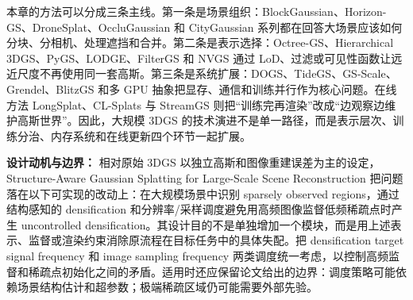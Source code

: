 \begin{takeaway}
本章的方法可以分成三条主线。第一条是场景组织：BlockGaussian、Horizon-GS、DroneSplat、OccluGaussian 和 CityGaussian 系列都在回答大场景应该如何分块、分相机、处理遮挡和合并。第二条是表示选择：Octree-GS、Hierarchical 3DGS、PyGS、LODGE、FilterGS 和 NVGS 通过 LoD、过滤或可见性函数让远近尺度不再使用同一套高斯。第三条是系统扩展：DOGS、TideGS、GS-Scale、Grendel、BlitzGS 和多 GPU 抽象把显存、通信和训练并行作为核心问题。在线方法 LongSplat、CL-Splats 与 StreamGS 则把“训练完再渲染”改成“边观察边维护高斯世界”。因此，大规模 3DGS 的技术演进不是单一路径，而是表示层次、训练分治、内存系统和在线更新四个环节一起扩展。
\end{takeaway}
\textbf{设计动机与边界：} 相对原始 3DGS 以独立高斯和图像重建误差为主的设定，Structure-Aware Gaussian Splatting for Large-Scale Scene Reconstruction 把问题落在以下可实现的改动上：在大规模场景中识别 sparsely observed regions，通过结构感知的 densification 和分辨率/采样调度避免用高频图像监督低频稀疏点时产生 uncontrolled densification。其设计目的不是单独增加一个模块，而是用上述表示、监督或渲染约束消除原流程在目标任务中的具体失配。把 densification target signal frequency 和 image sampling frequency 两类调度统一考虑，以控制高频监督和稀疏点初始化之间的矛盾。适用时还应保留论文给出的边界：调度策略可能依赖场景结构估计和超参数；极端稀疏区域仍可能需要外部先验。
